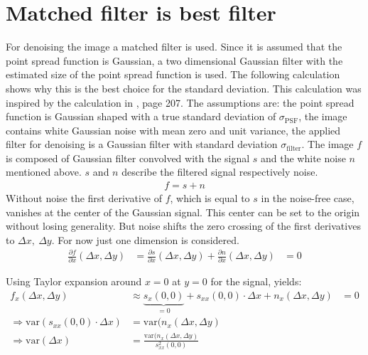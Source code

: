 \section{Matched filter is best filter} \label{detectionError}
For denoising the image a matched filter is used. Since it is assumed that the point spread function is Gaussian, a two dimensional Gaussian filter with the estimated size of the point spread function is used. The following calculation shows why this is the best choice for the standard deviation.\newline
This calculation was inspired by the calculation in \cite{ulli}, page 207.\newline 
The assumptions are: the point spread function is Gaussian shaped with a true standard deviation of $\sigma_\text{PSF}$, the image contains white Gaussian noise with mean zero and unit variance, the applied filter for denoising is a Gaussian filter with standard deviation $\sigma_\text{filter}$.\newline
The image $f$ is composed of Gaussian filter convolved with the signal $s$ and the white noise $n$ mentioned above. $s$ and $n$ describe the filtered signal respectively noise.
\begin{align}
 f=s+n \label{gl91}
\end{align}
Without noise the first derivative of $f$, which is equal to $s$ in the noise-free case, vanishes at the center of the Gaussian signal. This center can be set to the origin without losing generality. But noise shifts the zero crossing of the first derivatives to $\Delta x,~\Delta y$. For now just one dimension is considered.
\begin{align}
\frac{\partial f}{\partial x}\left(\Delta x, \Delta y\right) &= \frac{\partial s}{\partial x} \left(\Delta x, \Delta y\right) + \frac{\partial n}{\partial x}\left(\Delta x, \Delta y\right)&=0
\end{align}  

Using Taylor expansion around $x = 0$ at $y= 0$ for the signal, yields:
\begin{align}
f_x(\Delta x, \Delta y)&\approx \underbrace{s_x(0, 0)}_{=0} + s_{xx}(0, 0)\cdot \Delta x + n_x(\Delta x, \Delta y)&=0\\
\Rightarrow \text{var}(s_{xx}(0, 0)\cdot \Delta x)&= \text{var}(n_x(\Delta x,\Delta y)\\
\Rightarrow \text{var}(\Delta x) &= \frac{\text{var}(n_x(\Delta x, \Delta y)}{s_{xx}^2(0, 0)} \label{ch9gl1}
\end{align}

